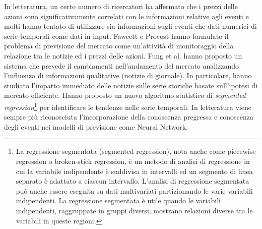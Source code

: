 \documentclass[a4paper,12pt]{report}
\begin{document}
In letteratura, un certo numero di ricercatori ha affermato che i prezzi delle azioni sono significativamente correlati con le informazioni relative agli eventi e molti hanno tentato di utilizzare sia informazioni sugli eventi che dati numerici di serie temporali come dati in input. Fawcett e Provost \cite{4} hanno formulato il problema di previsione del mercato come un'attività di monitoraggio della relazione tra le notizie ed i prezzi delle azioni. Fung et al. \cite{news-nn} hanno proposto un sistema che prevede il cambiamenti nell'andamento del mercato analizzando l'influenza di informazioni qualitative (notizie di giornale). In particolare, hanno studiato l'impatto immediato delle notizie sulle serie storiche basate sull'ipotesi di mercato efficiente. Hanno proposto un nuovo algoritmo statistico di \textit{segmented regression}\footnote{La regressione segmentata (segmented regression), nota anche come piecewise regression o broken-stick regression, è un metodo di analisi di regressione in cui la variabile indipendente è suddivisa in intervalli ed un segmento di linea separato è adattato a ciascun intervallo. L'analisi di regressione segmentata può anche essere eseguita su dati multivariati partizionando le varie variabili indipendenti. La regressione segmentata è utile quando le variabili indipendenti, raggruppate in gruppi diversi, mostrano relazioni diverse tra le variabili in queste regioni.} per identificare le tendenze nelle serie temporali. In letteratura viene sempre più riconosciuta l'incorporazione della conoscenza pregressa e conoscenza degli eventi nei modelli di previsione come Neural Network.
\end{document}
